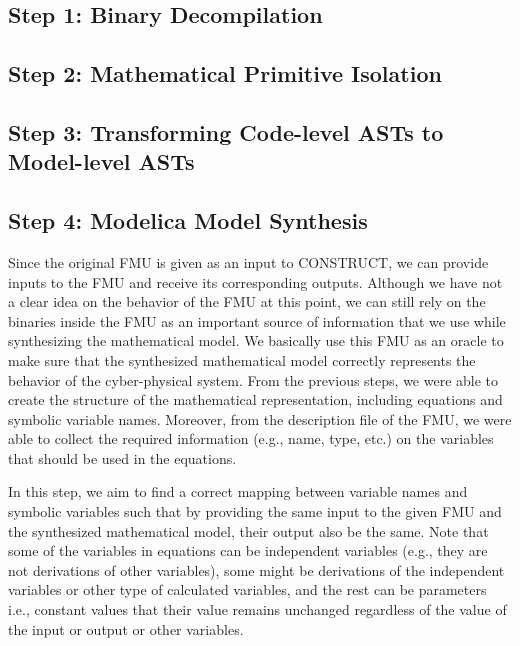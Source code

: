 \subsection{Step 1: Binary Decompilation}

\subsection{Step 2: Mathematical Primitive Isolation }

\subsection{Step 3: Transforming Code-level ASTs to Model-level ASTs}

\subsection{Step 4: Modelica Model Synthesis}
Since the original FMU is given as an input to \textsc{CONSTRUCT}, we can provide inputs to the FMU and receive its corresponding outputs. Although we have not a clear idea on the behavior of the FMU at this point, we can still rely on the binaries inside the FMU as an important source of information that we use while synthesizing the mathematical model. We basically use this FMU as an oracle to make sure that the synthesized mathematical model correctly represents the behavior of the cyber-physical system.
From the previous steps, we were able to create the structure of the mathematical representation, including equations and symbolic variable names. Moreover, from the description file of the FMU, we were able to collect the required information (e.g., name, type, etc.) on the variables that should be used in the equations. 

In this step, we aim to find a correct mapping between variable names and symbolic variables such that by providing the same input to the given FMU and the synthesized mathematical model, their output also be the same. Note that some of the variables in equations can be independent variables (e.g., they are not derivations of other variables), some might be derivations of the independent variables or other type of calculated variables, and the rest can be parameters i.e., constant values that their value remains unchanged regardless of the value of the input or output or other variables.

